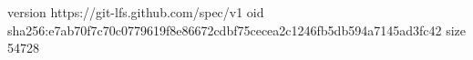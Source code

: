 version https://git-lfs.github.com/spec/v1
oid sha256:e7ab70f7c70c0779619f8e86672cdbf75cecea2c1246fb5db594a7145ad3fc42
size 54728
